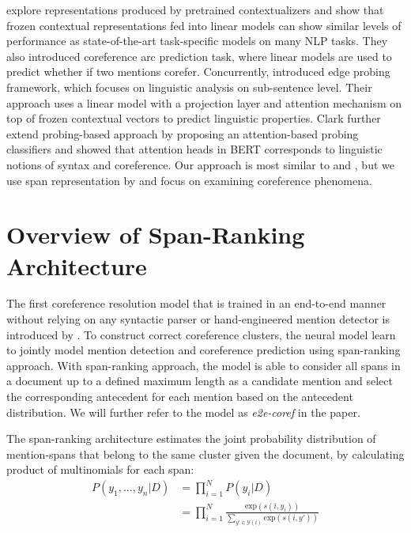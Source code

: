 \documentclass[11pt]{article}
\begin{document}
\parencite{liu2019linguistic} explore representations produced by pretrained contextualizers and show that frozen contextual representations fed into linear models can show similar levels of performance as state-of-the-art task-specific models on many NLP tasks. They also introduced coreference arc prediction task, where linear models are used to predict whether if two mentions corefer. Concurrently, \parencite{tenney2019context} introduced edge probing framework, which focuses on linguistic analysis on sub-sentence level. Their approach uses a linear model with a projection layer and attention mechanism on top of frozen contextual vectors to predict linguistic properties. Clark further extend probing-based approach by proposing an attention-based probing classifiers and showed that attention heads in BERT corresponds to linguistic notions of syntax and coreference. Our approach is most similar to \parencite{liu2019linguistic} and \parencite{tenney2019context}, but we use span representation by \parencite{lee2017end} and focus on examining coreference phenomena.




\section{Overview of Span-Ranking Architecture}
The first coreference resolution model that is trained in an end-to-end manner without relying on any syntactic parser or hand-engineered mention detector is introduced by \parencite{lee2017end}. To construct correct coreference clusters, the neural model learn to jointly model mention detection and coreference prediction using span-ranking approach.  With span-ranking approach, the model is able to consider all spans in a document up to a defined maximum length as a candidate mention and select the corresponding antecedent for each mention based on the antecedent distribution. We will further refer to the model as \textit{e2e-coref} in the paper.

The span-ranking architecture estimates the joint probability distribution of mention-spans that belong to the same cluster given the document, by calculating product of multinomials for each span:
\begin{align}
P(y_{1}, ..., y_{n}|D) &= \prod\limits_{i=1}^{N} P(y_{i}|D) \\
&= \prod\limits_{i=1}^{N} \frac{\text{exp}(s(i, y_{i}))}{\sum_{y' \in \mathcal{Y}(i)} \text{exp}(s(i, y'))}
\end{align}
\end{document}
